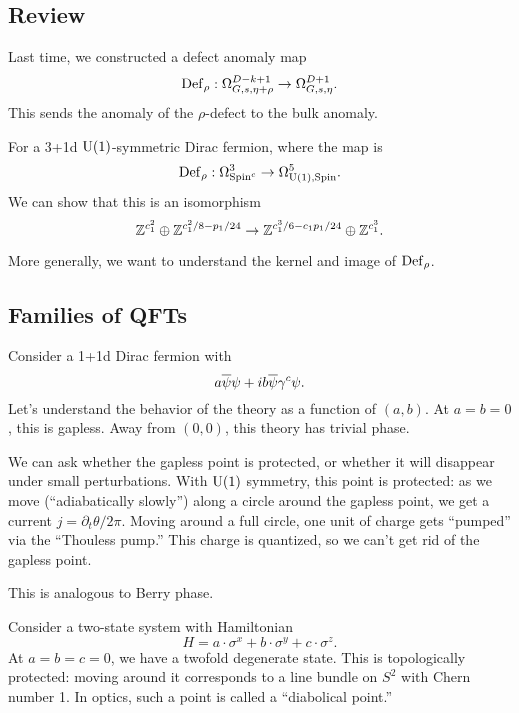 \subsection{Review}

Last time, we constructed a defect anomaly map
\[
	\operatorname{Def}_\rho: \Omega^{D-k+1}_{G,s,\eta+\rho} \to \Omega^{D+1}_{G,s,\eta}.
\]
This sends the anomaly of the $\rho$-defect to the bulk anomaly.

\begin{ex}
	For a 3+1d $\mathrm{U}(1)$-symmetric Dirac fermion, where the map is
	\[
		\operatorname{Def}_\rho: \Omega^3_{\mathrm{Spin}^c} \to \Omega^5_{\mathrm{U}(1),\mathrm{Spin}}.
	\]
	We can show that this is an isomorphism
	\[
		\mathbb{Z}^{c_1^2} \oplus \mathbb{Z}^{c_1^2 / 8 - p_1 / 24} \to \mathbb{Z}^{c_1^3 / 6 - c_1 p_1 / 24} \oplus \mathbb{Z}^{c_1^3}.
	\]
\end{ex}

More generally, we want to understand the kernel and image of $\operatorname{Def}_\rho$.

\subsection{Families of QFTs}

\begin{ex}
	Consider a 1+1d Dirac fermion with
	\[
		a \overline{\psi} \psi + i b \overline{\psi} \gamma^c \psi.
	\]
	Let's understand the behavior of the theory as a function of $(a, b)$.
	At $a = b = 0$, this is gapless.
	Away from $(0, 0)$, this theory has trivial phase.

	We can ask whether the gapless point is protected, or whether it will disappear under small perturbations.
	With $\mathrm{U}(1)$ symmetry, this point is protected: as we move (``adiabatically slowly'') along a circle around the gapless point, we get a current $j = \partial_t \theta / 2\pi$.
	Moving around a full circle, one unit of charge gets ``pumped'' via the ``Thouless pump.''
	This charge is quantized, so we can't get rid of the gapless point.
\end{ex}

This is analogous to Berry phase.

\begin{ex}
	Consider a two-state system with Hamiltonian
	\[
		H = a \cdot \sigma^x + b \cdot \sigma^y + c \cdot \sigma^z.
	\]
	At $a = b = c = 0$, we have a twofold degenerate state.
	This is topologically protected: moving around it corresponds to a line bundle on $S^2$ with Chern number 1.
	In optics, such a point is called a ``diabolical point.''
\end{ex}

